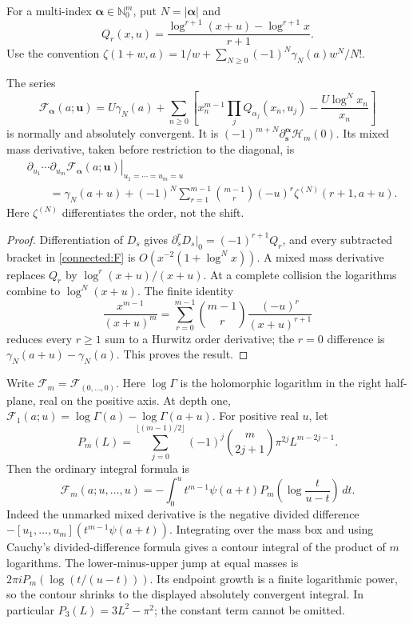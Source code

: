 For a multi-index $\boldsymbol\alpha\in\mathbb N_0^m$, put $N=|\boldsymbol\alpha|$
and
\[
 Q_r(x,u)=\frac{\log^{r+1}(x+u)-\log^{r+1}x}{r+1}.
\]
Use the convention
$\zeta(1+w,a)=1/w+\sum_{N\ge0}(-1)^N\gamma_N(a)w^N/N!$.

\begin{theorem}
\label{connected:primitive}
The series
\begin{equation}\label{connected:F}
 \mathcal F_{\boldsymbol\alpha}(a;\boldsymbol u)
 =U\gamma_N(a)+\sum_{n\ge0}
 \left[x_n^{m-1}\prod_jQ_{\alpha_j}(x_n,u_j)
                  -\frac{U\log^N x_n}{x_n}\right]
\end{equation}
is normally and absolutely convergent. It is
$(-1)^{m+N}\partial_{\boldsymbol s}^{\boldsymbol\alpha}\mathcal H_m(0)$.
Its mixed mass derivative, taken before restriction to the diagonal, is
\begin{align}\label{connected:collision}
 &\left.\partial_{u_1}\cdots\partial_{u_m}
       \mathcal F_{\boldsymbol\alpha}(a;\boldsymbol u)
       \right|_{u_1=\cdots=u_m=u}\\
 &\qquad=\gamma_N(a+u)+(-1)^N
    \sum_{r=1}^{m-1}\binom{m-1}{r}(-u)^r
                           \zeta^{(N)}(r+1,a+u).\nonumber
\end{align}
Here $\zeta^{(N)}$ differentiates the order, not the shift.
\end{theorem}
\begin{proof}
Differentiation of $D_s$ gives
$\partial_s^rD_s|_0=(-1)^{r+1}Q_r$, and every subtracted bracket in
\eqref{connected:F} is $O(x^{-2}(1+\log^N x))$.
A mixed mass derivative replaces $Q_r$ by $\log^r(x+u)/(x+u)$.
At a complete collision the logarithms combine to $\log^N(x+u)$.
The finite identity
\[
 \frac{x^{m-1}}{(x+u)^m}
 =\sum_{r=0}^{m-1}\binom{m-1}{r}\frac{(-u)^r}{(x+u)^{r+1}}
\]
reduces every $r\ge1$ sum to a Hurwitz order derivative; the $r=0$
difference is $\gamma_N(a+u)-\gamma_N(a)$. This proves the result.
\end{proof}

Write $\mathcal F_m=\mathcal F_{(0,\ldots,0)}$. Here $\log\Gamma$ is the holomorphic logarithm in the right half-plane, real on the positive axis. At depth one,
$\mathcal F_1(a;u)=\log\Gamma(a)-\log\Gamma(a+u)$.
For positive real $u$, let
\[
 P_m(L)=\sum_{j=0}^{\lfloor(m-1)/2\rfloor}
          (-1)^j\binom m{2j+1}\pi^{2j}L^{m-2j-1}.
\]
Then the ordinary integral formula is
\begin{equation}\label{connected:gamma}
 \mathcal F_m(a;u,\ldots,u)
 =-\int_0^u t^{m-1}\psi(a+t)
                   P_m\left(\log\frac{t}{u-t}\right)\,dt.
\end{equation}
Indeed the unmarked mixed derivative is the negative divided difference
$-[u_1,\ldots,u_m](t^{m-1}\psi(a+t))$. Integrating over the mass box and
using Cauchy's divided-difference formula gives a contour integral of the
product of $m$ logarithms. The lower-minus-upper jump at equal masses is
$2\pi iP_m(\log(t/(u-t)))$. Its endpoint growth is a finite logarithmic
power, so the contour shrinks to the displayed absolutely convergent
integral. In particular $P_3(L)=3L^2-\pi^2$; the constant term cannot be omitted.

